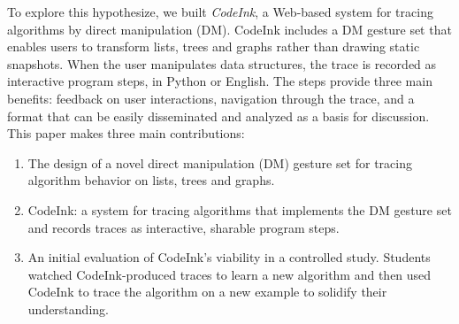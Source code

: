 To explore this hypothesize, we built \emph{CodeInk}, a Web-based system for tracing
algorithms by direct manipulation (DM). CodeInk includes a DM gesture set that
enables users to transform lists, trees and graphs rather than drawing
static snapshots. When the user manipulates data structures, the trace is recorded as
interactive program steps, in Python or English. The steps provide
three main benefits: feedback on user interactions, navigation through the
trace, and a format that can be easily disseminated and analyzed as a basis for
discussion. This paper makes three main contributions:

\begin{enumerate}\itemsep0pt

\item The design of a novel direct manipulation (DM) gesture set for tracing algorithm
behavior on lists, trees and graphs.

\item CodeInk: a system for tracing algorithms that implements the DM
gesture set and records traces as interactive, sharable program steps.

\item An initial evaluation of CodeInk's viability in a controlled
study. Students watched CodeInk-produced traces to learn a new algorithm
and then used CodeInk to trace the algorithm on a new example to
solidify their understanding.

\end{enumerate}

